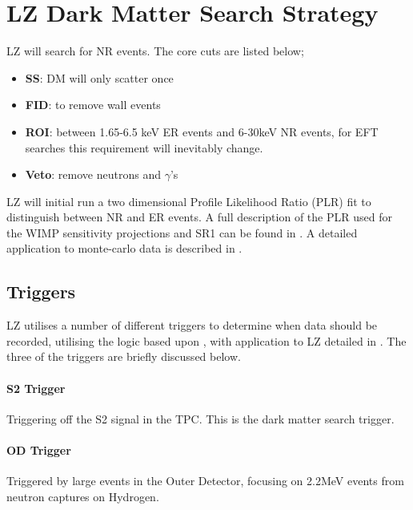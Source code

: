 \section{LZ Dark Matter Search Strategy}
\par
LZ will search for NR events.
The core cuts are listed below;
\begin{itemize}
    \item \textbf{SS}: DM will only scatter once
    \item \textbf{FID}: to remove wall events
    \item \textbf{ROI}: between 1.65-6.5 keV ER events and 6-30keV NR events, for EFT searches this requirement will inevitably change.
    \item \textbf{Veto}: remove neutrons and $\gamma$'s 
\end{itemize}

\par
LZ will initial run a two dimensional Profile Likelihood Ratio (PLR) fit to distinguish between NR and ER events.
A full description of the PLR used for the WIMP sensitivity projections and SR1 can be found in \cite{LZ_Ibles_LZStats_Thesis_ref}. 
A detailed application to monte-carlo data is described in \cite{jonathannikoleyczik_thesis_ref}.




\subsection{Triggers}
\par
LZ utilises a number of different triggers to determine when data should be recorded, utilising the logic based upon \cite{lux_trigger_logic_ref}, with application to LZ detailed in \cite{nicolasangelides_thesis_ref}.
The three of the triggers are briefly discussed below.


\paragraph{S2 Trigger}
\par
Triggering off the S2 signal in the TPC. 
This is the dark matter search trigger.

\paragraph{OD Trigger}
\par
Triggered by large events in the Outer Detector, focusing on 2.2MeV events from neutron captures on Hydrogen.

